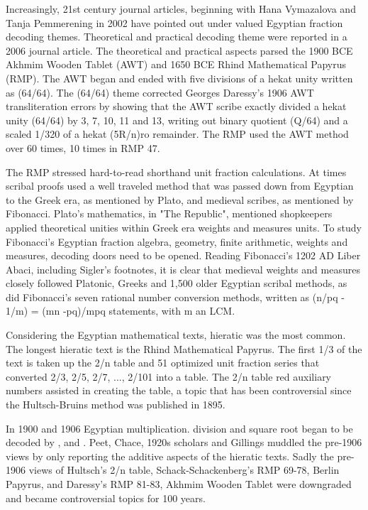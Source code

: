 \documentclass[12pt]{article}
\begin{document}
Increasingly, 21st century journal articles, beginning with Hana Vymazalova and Tanja Pemmerening in 2002 have pointed out under valued Egyptian fraction decoding themes. Theoretical and practical decoding theme were reported in a 2006 journal article. The theoretical and practical aspects parsed the 1900 BCE Akhmim Wooden Tablet (AWT) and 1650 BCE Rhind Mathematical Papyrus (RMP). The AWT began and ended with five divisions of a hekat unity written as (64/64). The (64/64) theme corrected Georges Daressy's 1906 AWT transliteration errors by showing that the AWT scribe exactly divided a hekat unity (64/64) by 3, 7, 10, 11 and 13, writing out binary quotient (Q/64) and a scaled 1/320 of a hekat (5R/n)ro remainder. The RMP used the AWT method over 60 times, 10 times in RMP 47. 

The RMP stressed hard-to-read shorthand unit fraction calculations. At times scribal proofs used a well traveled method that was passed down from Egyptian to the Greek era, as mentioned by Plato, and medieval scribes, as mentioned by Fibonacci. Plato's mathematics, in "The Republic", mentioned shopkeepers applied theoretical unities within Greek era weights and measures units. To study Fibonacci's Egyptian fraction algebra, geometry, finite arithmetic, weights and measures, decoding doors need to be opened. Reading Fibonacci's 1202 AD Liber Abaci, including Sigler's footnotes, it is clear that medieval weights and measures closely followed Platonic, Greeks and 1,500 older Egyptian scribal methods, as did Fibonacci's seven rational number conversion methods, written as (n/pq - 1/m) = (mn -pq)/mpq statements, with m an LCM.

Considering the Egyptian mathematical texts, hieratic was the most common. The longest hieratic text is the Rhind Mathematical Papyrus. The first 1/3 of the text is taken up the 2/n table and 51 optimized unit fraction series that converted 2/3, 2/5, 2/7, ..., 2/101 into a table. The 2/n table red auxiliary numbers assisted in creating the table, a topic that has been controversial since the Hultsch-Bruins method was published in 1895. 

In 1900 and 1906 Egyptian multiplication. division and square root began to be decoded by 
, and .  Peet, Chace, 1920s scholars and Gillings muddled the pre-1906 views by only reporting the additive aspects of the hieratic texts. Sadly the pre-1906 views of Hultsch's 2/n table, Schack-Schackenberg's RMP 69-78, Berlin Papyrus, and Daressy's RMP 81-83, Akhmim Wooden Tablet were downgraded and became controversial topics for 100 years. 
\end{document}
